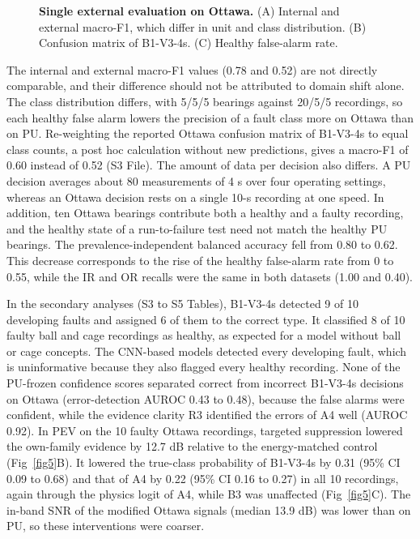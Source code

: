 \documentclass[10pt,letterpaper]{article}
\begin{document}
\begin{figure}[!h]
\caption{\textbf{Single external evaluation on Ottawa.} (A) Internal and external macro-F1, which differ in unit and class distribution. (B) Confusion matrix of B1-V3-4s. (C) Healthy false-alarm rate.}
\label{fig7}
\end{figure}

The internal and external macro-F1 values (0.78 and 0.52) are not directly comparable, and their difference should not be attributed to domain shift alone. The class distribution differs, with 5/5/5 bearings against 20/5/5 recordings, so each healthy false alarm lowers the precision of a fault class more on Ottawa than on PU. Re-weighting the reported Ottawa confusion matrix of B1-V3-4s to equal class counts, a post hoc calculation without new predictions, gives a macro-F1 of 0.60 instead of 0.52 (S3 File). The amount of data per decision also differs. A PU decision averages about 80 measurements of 4 s over four operating settings, whereas an Ottawa decision rests on a single 10-s recording at one speed. In addition, ten Ottawa bearings contribute both a healthy and a faulty recording, and the healthy state of a run-to-failure test need not match the healthy PU bearings. The prevalence-independent balanced accuracy fell from 0.80 to 0.62. This decrease corresponds to the rise of the healthy false-alarm rate from 0 to 0.55, while the IR and OR recalls were the same in both datasets (1.00 and 0.40).

In the secondary analyses (S3 to S5 Tables), B1-V3-4s detected 9 of 10 developing faults and assigned 6 of them to the correct type. It classified 8 of 10 faulty ball and cage recordings as healthy, as expected for a model without ball or cage concepts. The CNN-based models detected every developing fault, which is uninformative because they also flagged every healthy recording. None of the PU-frozen confidence scores separated correct from incorrect B1-V3-4s decisions on Ottawa (error-detection AUROC 0.43 to 0.48), because the false alarms were confident, while the evidence clarity R3 identified the errors of A4 well (AUROC 0.92). In PEV on the 10 faulty Ottawa recordings, targeted suppression lowered the own-family evidence by 12.7 dB relative to the energy-matched control (Fig~\ref{fig5}B). It lowered the true-class probability of B1-V3-4s by 0.31 (95\% CI 0.09 to 0.68) and that of A4 by 0.22 (95\% CI 0.16 to 0.27) in all 10 recordings, again through the physics logit of A4, while B3 was unaffected (Fig~\ref{fig5}C). The in-band SNR of the modified Ottawa signals (median 13.9 dB) was lower than on PU, so these interventions were coarser.
\end{document}
